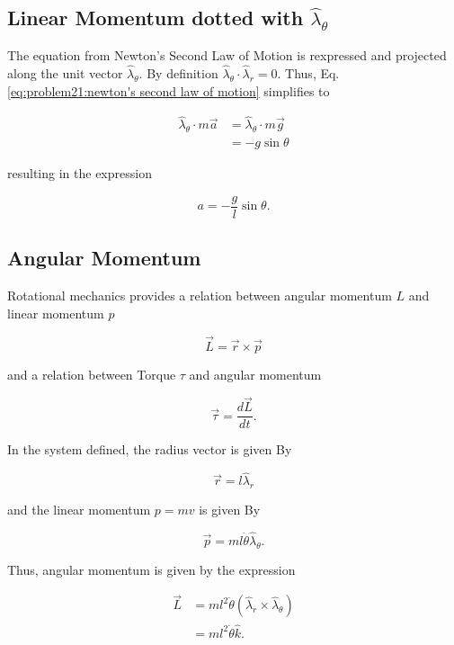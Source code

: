 \subsection{Linear Momentum dotted with $\hat\lambda_\theta$}
The equation from Newton's Second Law of Motion is rexpressed and projected along the unit vector $\hat\lambda_\theta$. By definition $\hat\lambda_\theta \cdot \hat\lambda_r = 0$. Thus, Eq. \ref{eq:problem21:newton's second law of motion} simplifies to

\begin{align}
    \hat\lambda_\theta \cdot m\vec{a} &= \hat\lambda_\theta \cdot m\vec{g} \nonumber \\
    &= -g\sin\theta
\end{align}

resulting in the expression

\begin{equation}
    a = -\frac{g}{l}\sin\theta.
\end{equation}

\subsection{Angular Momentum}
Rotational mechanics provides a relation between angular momentum $L$ and linear momentum $p$

\begin{equation}
    \vec{L} = \vec{r} \times \vec{p}
\end{equation}

and a relation between Torque $\tau$ and angular momentum

\begin{equation}
    \vec{\tau} = \frac{d\vec{L}}{dt}.
\end{equation}

In the system defined, the radius vector is given By

\begin{equation}
    \vec{r} = l\hat\lambda_r
\end{equation}

and the linear momentum $p = mv$ is given By

\begin{equation}
    \vec{p} = ml\dot{\theta} \hat\lambda_\theta.
\end{equation}

Thus, angular momentum is given by the expression

\begin{align}
    \vec{L} &= ml^2\dot\theta \left(\hat\lambda_r \times \hat\lambda_\theta \right) \nonumber \\
    &= ml^2\dot\theta \hat{k}.
    \label{eq:problem21:angular momentum}
\end{align}

